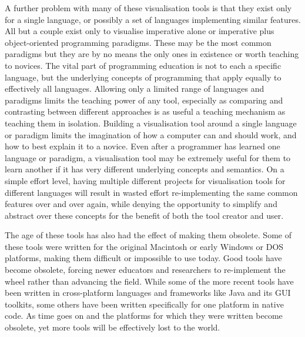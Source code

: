 A further problem with many of these visualisation tools is that they exist only for a single language, or possibly a set of languages implementing similar features. All but a couple exist only to visualise imperative alone or imperative plus object-oriented programming paradigms. These may be the most common paradigms but they are by no means the only ones in existence or worth teaching to novices. The vital part of programming education is not to each a specific language, but the underlying concepts of programming that apply equally to effectively all languages. Allowing only a limited range of languages and paradigms limits the teaching power of any tool, especially as comparing and contrasting between different approaches is as useful a teaching mechanism as teaching them in isolation. Building a visualisation tool around a single language or paradigm limits the imagination of how a computer can and should work, and how to best explain it to a novice. Even after a programmer has learned one language or paradigm, a visualisation tool may be extremely useful for them to learn another if it has very different underlying concepts and semantics. On a simple effort level, having multiple different projects for visualisation tools for different languages will result in wasted effort re-implementing the same common features over and over again, while denying the opportunity to simplify and abstract over these concepts for the benefit of both the tool creator and user.

The age of these tools has also had the effect of making them obsolete. Some of these tools were written for the original Macintosh or early Windows or DOS platforms, making them difficult or impossible to use today. Good tools have become obsolete, forcing newer educators and researchers to re-implement the wheel rather than advancing the field. While some of the more recent tools have been written in cross-platform languages and frameworks like Java and its GUI toolkits, some others have been written specifically for one platform in native code. As time goes on and the platforms for which they were written become obsolete, yet more tools will be effectively lost to the world.

